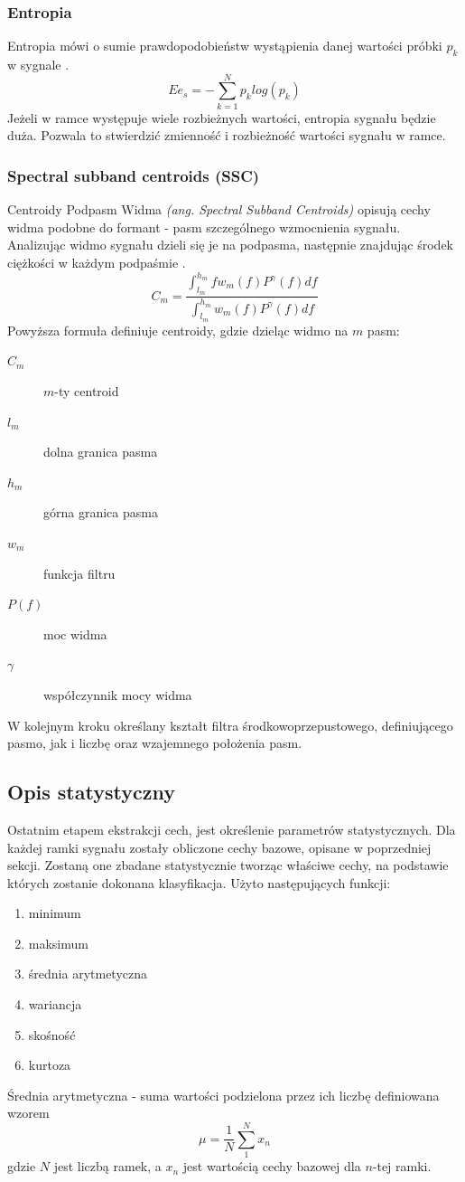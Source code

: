 \documentclass[a4paper,12pt,twoside,openany]{report}
\newcommand{\ang}[1]{\textit{(ang. #1)}}
\begin{document}
\subsubsection{Entropia}
Entropia mówi o sumie prawdopodobieństw wystąpienia danej wartości próbki $p_k$ w sygnale \cite{Majstorovic2011}.
\begin{equation}
	Ee_{s}=-\sum _{k=1}^{N}p_k log(p_k)
	\label{eq:entropy}
\end{equation}
Jeżeli w ramce występuje wiele rozbieżnych wartości, entropia sygnału będzie duża. 
Pozwala to stwierdzić zmienność i rozbieżność wartości sygnału w ramce.
\subsubsection{Spectral subband centroids (SSC)}
Centroidy Podpasm Widma \ang{Spectral Subband Centroids} opisują cechy widma podobne do formant - pasm szczególnego wzmocnienia sygnału.
Analizując widmo sygnału dzieli się je na podpasma, następnie znajdując środek ciężkości w każdym podpaśmie \cite{Majstorovic2011}.
\begin{equation}
	C_m=\frac
	{\int_{l_m}^{h_m} f w_m(f) P^\gamma(f)df}
	{\int_{l_m}^{h_m} w_m(f) P^\gamma(f)df}
	\label{eq:ssc}
\end{equation}
Powyższa formuła definiuje centroidy, gdzie dzieląc widmo na $m$ pasm:
\begin{description}
	\item[$C_m$] $m$-ty centroid
	\item[$l_m$] dolna granica pasma
	\item[$h_m$] górna granica pasma
	\item[$w_m$] funkcja filtru
	\item[$P(f)$] moc widma
	\item[$\gamma$] współczynnik mocy widma
\end{description}
W kolejnym kroku określany kształt filtra środkowoprzepustowego, definiującego pasmo, 
jak i liczbę oraz wzajemnego położenia pasm.
\subsection{Opis statystyczny}
Ostatnim etapem ekstrakcji cech, jest określenie parametrów statystycznych.
Dla każdej ramki sygnału zostały obliczone cechy bazowe, opisane w poprzedniej sekcji.
Zostaną one zbadane statystycznie tworząc właściwe cechy, na podstawie których zostanie dokonana klasyfikacja.
Użyto następujących funkcji:
\begin{enumerate}
	\item minimum 
	\item maksimum 
	\item średnia arytmetyczna
	\item wariancja 
	\item skośność
	\item kurtoza
\end{enumerate}
Średnia arytmetyczna - suma wartości podzielona przez ich liczbę definiowana wzorem 
\begin{equation}
	\mu = \frac{1}{N}\sum_1^Nx_n
\end{equation}
gdzie $N$ jest liczbą ramek, a $x_n$ jest wartością cechy bazowej dla $n$-tej ramki.
\end{document}
